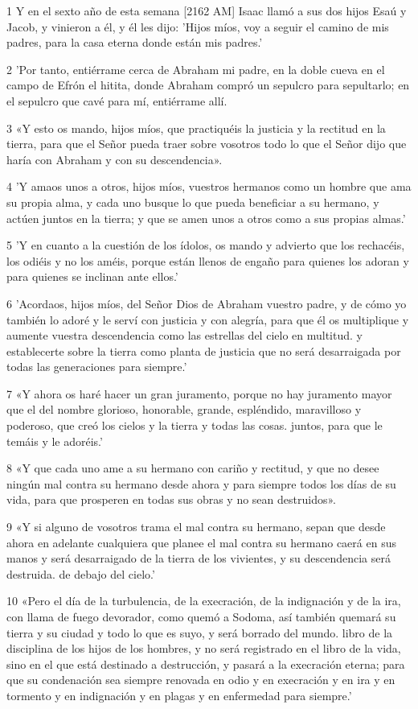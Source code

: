 \par 1 Y en el sexto año de esta semana [2162 AM] Isaac llamó a sus dos hijos Esaú y Jacob, y vinieron a él, y él les dijo: 'Hijos míos, voy a seguir el camino de mis padres, para la casa eterna donde están mis padres.'
\par 2 'Por tanto, entiérrame cerca de Abraham mi padre, en la doble cueva en el campo de Efrón el hitita, donde Abraham compró un sepulcro para sepultarlo; en el sepulcro que cavé para mí, entiérrame allí.
\par 3 «Y esto os mando, hijos míos, que practiquéis la justicia y la rectitud en la tierra, para que el Señor pueda traer sobre vosotros todo lo que el Señor dijo que haría con Abraham y con su descendencia».
\par 4 'Y amaos unos a otros, hijos míos, vuestros hermanos como un hombre que ama su propia alma, y ​​cada uno busque lo que pueda beneficiar a su hermano, y actúen juntos en la tierra; y que se amen unos a otros como a sus propias almas.'
\par 5 'Y en cuanto a la cuestión de los ídolos, os mando y advierto que los rechacéis, los odiéis y no los améis, porque están llenos de engaño para quienes los adoran y para quienes se inclinan ante ellos.'
\par 6 'Acordaos, hijos míos, del Señor Dios de Abraham vuestro padre, y de cómo yo también lo adoré y le serví con justicia y con alegría, para que él os multiplique y aumente vuestra descendencia como las estrellas del cielo en multitud. y establecerte sobre la tierra como planta de justicia que no será desarraigada por todas las generaciones para siempre.'
\par 7 «Y ahora os haré hacer un gran juramento, porque no hay juramento mayor que el del nombre glorioso, honorable, grande, espléndido, maravilloso y poderoso, que creó los cielos y la tierra y todas las cosas. juntos, para que le temáis y le adoréis.'
\par 8 «Y que cada uno ame a su hermano con cariño y rectitud, y que no desee ningún mal contra su hermano desde ahora y para siempre todos los días de su vida, para que prosperen en todas sus obras y no sean destruidos».
\par 9 «Y si alguno de vosotros trama el mal contra su hermano, sepan que desde ahora en adelante cualquiera que planee el mal contra su hermano caerá en sus manos y será desarraigado de la tierra de los vivientes, y su descendencia será destruida. de debajo del cielo.'
\par 10 «Pero el día de la turbulencia, de la execración, de la indignación y de la ira, con llama de fuego devorador, como quemó a Sodoma, así también quemará su tierra y su ciudad y todo lo que es suyo, y será borrado del mundo. libro de la disciplina de los hijos de los hombres, y no será registrado en el libro de la vida, sino en el que está destinado a destrucción, y pasará a la execración eterna; para que su condenación sea siempre renovada en odio y en execración y en ira y en tormento y en indignación y en plagas y en enfermedad para siempre.'
